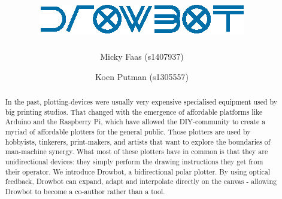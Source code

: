 \documentclass[a4paper,10pt]{article}
\title{\vspace{-5.5em}
\includegraphics[scale=1]{img/logo.eps} \\ \vspace{.5em}
\Large \sffamily{A Suspended Polar Plotting Robot}}
\author{Micky Faas (s1407937) \and Koen Putman (s1305557)}
\date{}
\begin{document}
\maketitle
\begin{abstract}
In the past, plotting-devices were usually very expensive specialised
equipment used by big printing studios.
That changed with the emergence of affordable platforms like Arduino and the
Raspberry Pi, which have allowed the DIY-community to create a myriad of
affordable plotters for the general public.
Those plotters are used by hobbyists, tinkerers, print-makers, and artists that
want to explore the boundaries of man-machine synergy.
What most of these plotters have in common is that they are unidirectional
devices: they simply perform the drawing instructions they get from their
operator.
We introduce Drowbot, a bidirectional polar plotter.
By using optical feedback, Drowbot can expand, adapt and interpolate
directly on the canvas - allowing Drowbot to become a co-author rather than a tool.

\end{abstract}
\end{document}
